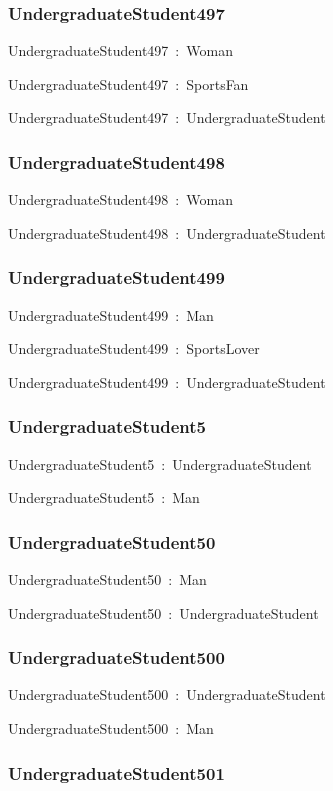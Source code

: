 \documentclass{article}
\begin{document}
\subsubsection*{UndergraduateStudent497}

UndergraduateStudent497~:~Woman

UndergraduateStudent497~:~SportsFan

UndergraduateStudent497~:~UndergraduateStudent

\subsubsection*{UndergraduateStudent498}

UndergraduateStudent498~:~Woman

UndergraduateStudent498~:~UndergraduateStudent

\subsubsection*{UndergraduateStudent499}

UndergraduateStudent499~:~Man

UndergraduateStudent499~:~SportsLover

UndergraduateStudent499~:~UndergraduateStudent

\subsubsection*{UndergraduateStudent5}

UndergraduateStudent5~:~UndergraduateStudent

UndergraduateStudent5~:~Man

\subsubsection*{UndergraduateStudent50}

UndergraduateStudent50~:~Man

UndergraduateStudent50~:~UndergraduateStudent

\subsubsection*{UndergraduateStudent500}

UndergraduateStudent500~:~UndergraduateStudent

UndergraduateStudent500~:~Man

\subsubsection*{UndergraduateStudent501}
\end{document}
